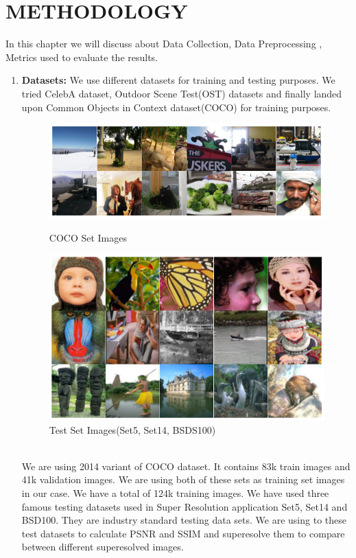 \newpage
\section{METHODOLOGY}
In this chapter we will discuss about Data Collection, Data Preprocessing , Metrics used to evaluate the results.
\begin{enumerate}
    \item {\bf Datasets:} 
        We use different datasets for training and testing purposes. We tried CelebA dataset, Outdoor Scene Test(OST) datasets and finally landed upon  Common Objects in Context dataset(COCO) for training purposes.
        \begin{figure}[ht]
            \centering
            \includegraphics[width=5in]{./figures/train.png}
            \caption{COCO Set Images}
            \includegraphics[width=5.5in]{./figures/test.png}
            \caption{Test Set Images(Set5, Set14, BSDS100)}
        \end{figure}  \\
        We are using 2014 variant of COCO dataset. It contains 83k train images and 41k validation images. We are using both of these sets as training set images in our case. We have a total of 124k training images. We have used three famous testing datasets used in Super Resolution application Set5, Set14 and BSD100. They are industry standard testing data sets. We are using to these test datasets to calculate PSNR and SSIM and superesolve them to compare between different superesolved images.

\end{enumerate}
